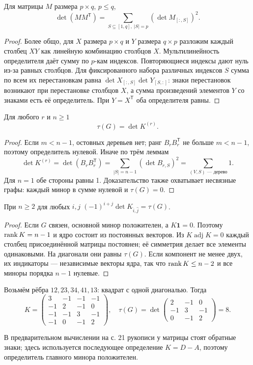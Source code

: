 \begin{lemma}
Для матрицы \(M\) размера \(p\times q\), \(p\le q\),
\[
 \det(MM^{\mathsf T})=\sum_{S\subseteq[1,q],\ |S|=p}(\det M_{[:,S]})^2.
\]
\end{lemma}
\begin{proof}
Более общо, для \(X\) размера \(p\times q\) и \(Y\) размера \(q\times p\)
разложим каждый столбец \(XY\) как линейную комбинацию столбцов \(X\).
Мультилинейность определителя даёт сумму по \(p\)-кам индексов.
Повторяющиеся индексы дают нуль из-за равных столбцов. Для фиксированного
набора различных индексов \(S\) сумма по всем их перестановкам равна
\(\det X_{[:,S]}\det Y_{[S,:]}\): знаки перестановок возникают при
перестановке столбцов \(X\), а сумма произведений элементов \(Y\)
со знаками есть её определитель. При \(Y=X^{\mathsf T}\) оба определителя равны.
\end{proof}
\begin{theorem}[Кирхгоф]
Для любого \(r\) и \(n\ge1\)
\[
 \boxed{\tau(G)=\det K^{(r)}}.
\]
\end{theorem}
\begin{proof}
Если \(m<n-1\), остовных деревьев нет; ранг \(B_rB_r^{\mathsf T}\)
не больше \(m<n-1\), поэтому определитель нулевой.
Иначе по трём леммам
\[
 \det K^{(r)}=\det(B_rB_r^{\mathsf T})
 =\sum_{|S|=n-1}(\det B_{r,S})^2=\sum_{(V,S)\text{ — дерево}}1.
\]
Для \(n=1\) обе стороны равны 1. Доказательство также охватывает несвязные графы:
каждый минор в сумме нулевой и \(\tau(G)=0\).
\end{proof}
\begin{cor}
При \(n\ge2\) для любых \(i,j\)
\( (-1)^{i+j}\det K_{\widehat i,\widehat j}=\tau(G)\).
\end{cor}
\begin{proof}
Если \(G\) связен, основной минор положителен, а \(K\boldsymbol1=0\).
Поэтому \(\operatorname{rank} K=n-1\) и ядро состоит из постоянных векторов.
Из \(K\operatorname{adj}K=0\) каждый столбец присоединённой матрицы
постоянен; её симметрия делает все элементы одинаковыми.
На диагонали они равны \(\tau(G)\). Если компонент не менее двух,
их индикаторы — независимые векторы ядра, так что \(\operatorname{rank} K\le n-2\)
и все миноры порядка \(n-1\) нулевые.
\end{proof}
\begin{example}
Возьмём рёбра \(12,23,34,41,13\): квадрат с одной диагональю.
Тогда
\[
K=\begin{pmatrix}3&-1&-1&-1\\-1&2&-1&0\\-1&-1&3&-1\\-1&0&-1&2\end{pmatrix},
\quad \tau(G)=\det\begin{pmatrix}2&-1&0\\-1&3&-1\\0&-1&2\end{pmatrix}=8.
\]


В предварительном вычислении на с. 21 рукописи у матрицы стоят обратные
знаки; здесь используется последующее определение \(K=D-A\), поэтому
определитель главного минора положителен.
\end{example}
